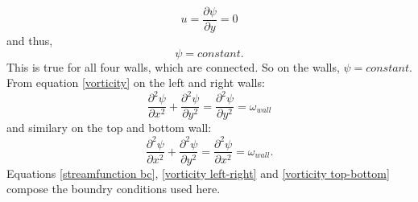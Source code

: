 \documentclass{article}
\begin{document}
\begin{equation}
	u = \frac{\partial \psi}{\partial y} = 0
\end{equation}
and thus,
\begin{equation}
	\psi = constant.
	\label{streamfunction bc}
\end{equation}
This is true for all four walls, which are connected. So on the walls, $\psi = constant$.
From equation \ref{vorticity} on the left and right walls:
\begin{equation}
	\frac{\partial^2 \psi}{\partial x^2} + \frac{\partial^2 \psi}{\partial y^2} = \frac{\partial^2 \psi}{\partial y^2}= \omega_{wall}
	\label{vorticity left-right}
\end{equation}
and similary on the top and bottom wall:
\begin{equation}
	\frac{\partial^2 \psi}{\partial x^2} + \frac{\partial^2 \psi}{\partial y^2} = \frac{\partial^2 \psi}{\partial x^2}= \omega_{wall}.
	\label{vorticity top-bottom}
\end{equation}
Equations \ref{streamfunction bc}, \ref{vorticity left-right} and \ref{vorticity top-bottom} compose the boundry conditions used here.





\newline



 
\end{document}
